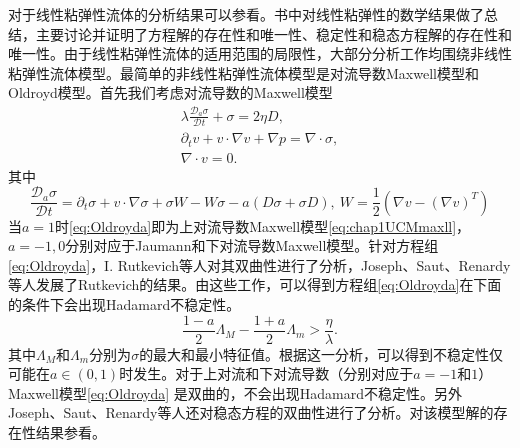对于线性粘弹性流体的分析结果可以参看\cite{fabrizio1992mathematical,renardy2000mathematical}。书中对线性粘弹性的数学结果做了总结，主要讨论并证明了方程解的存在性和唯一性、稳定性和稳态方程解的存在性和唯一性。由于线性粘弹性流体的适用范围的局限性，大部分分析工作均围绕非线性粘弹性流体模型。最简单的非线性粘弹性流体模型是对流导数Maxwell模型和Oldroyd模型。首先我们考虑对流导数的Maxwell模型
\begin{subequations}\label{eq:Oldroyda}
\begin{align}
	\lambda \frac{\mathcal{D}_a \sigma}{\mathcal{D} t} + \sigma = 2 \eta D, \\
	\partial_t v + v \cdot \nabla v  + \nabla p = \nabla \cdot \sigma, \\
	\nabla \cdot v = 0.
\end{align}
\end{subequations}
其中
\begin{equation*}%
	\frac{\mathcal{D}_a \sigma}{\mathcal{D} t} = \partial_t \sigma + v \cdot \nabla \sigma + \sigma W- W \sigma - a(D \sigma + \sigma D), \ W = \frac{1}{2}(\nabla v - (\nabla v)^T)
\end{equation*}
当$a=1$时\eqref{eq:Oldroyda}即为上对流导数Maxwell模型\eqref{eq:chap1UCMmaxll}，$a=-1,0$分别对应于Jaumann和下对流导数Maxwell模型。针对方程组\eqref{eq:Oldroyda}，I. Rutkevich等人对其双曲性进行了分析\cite{rutkevich1969some,rutkevich1970propagation}，Joseph、Saut、Renardy等人发展了Rutkevich的结果\cite{joseph1987hyperbolicity,joseph1986change}。由这些工作，可以得到方程组\eqref{eq:Oldroyda}在下面的条件下会出现Hadamard不稳定性。
\begin{equation*}
	\frac{1-a}{2} \Lambda_M - \frac{1+a}{2} \Lambda_m > \frac{\eta}{\lambda}.
\end{equation*}
其中$\Lambda_M$和$\Lambda_m$分别为$\sigma$的最大和最小特征值。根据这一分析，可以得到不稳定性仅可能在$a\in (0,1)$时发生。对于上对流和下对流导数（分别对应于$a=-1$和$1$）Maxwell模型\eqref{eq:Oldroyda}
是双曲的，不会出现Hadamard不稳定性。另外Joseph、Saut、Renardy等人还对稳态方程的双曲性进行了分析。对该模型解的存在性结果参看\cite{saut2012lectures}。

